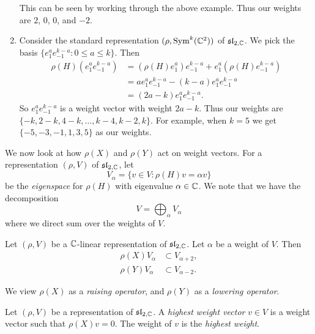 \begin{example}
\begin{enumerate}
\begin{lemma}
              \end{lemma}
              This can be seen by working through the above example. Thus our weights are $2$, $0$, $0$, and $-2$.
        \item Consider the standard representation $(\rho, \operatorname{Sym}^k(\mathbb C^2))$ of $\mathfrak{sl}_{2, \mathbb C}$. We pick the basis $\{e_1^ae_{-1}^{k-a}: 0 \leq a \leq k\}$. Then
              \begin{align*}
                  \rho(H)(e_1^ae_{-1}^{k-a})
                   & = \left(\rho(H)e_1^a\right)e_{-1}^{k-a} + e_1^a\left(\rho(H)e_{-1}^{k-a}\right) \\
                   & = ae_1^ae_{-1}^{k-a} - (k-a) e_1^ae_{-1}^{k-a}                                  \\
                   & = (2a-k) e_1^a e_{-1}^{k-a}.
              \end{align*}
              So $e_1^a e_{-1}^{k-a}$ is a weight vector with weight $2a - k$. Thus our weights are $\{-k, 2-k, 4-k, \ldots, k-4, k-2, k\}$.  For example, when $k = 5$ we get $\{-5, -3, -1, 1, 3, 5\}$ as our weights.
    \end{enumerate}
\end{example}

We now look at how $\rho(X)$ and $\rho(Y)$ act on weight vectors. For a representation $(\rho, V)$ of $\mathfrak{sl}_{2, \mathbb C}$, let
\[ V_\alpha = \{v \in V: \rho(H)v = \alpha v\} \]
be the \emph{eigenspace} for $\rho(H)$ with eigenvalue $\alpha \in \mathbb C$. We note that we have the decomposition
\[ V = \bigoplus_{\alpha} V_\alpha \]
where we direct sum over the weights of $V$.

\begin{proposition}
    Let $(\rho, V)$ be a $\mathbb C$-linear representation of $\mathfrak{sl}_{2, \mathbb C}$. Let $\alpha$ be a weight of $V$. Then
    \begin{align*}
        \rho(X)V_\alpha & \subset V_{\alpha + 2}, \\
        \rho(Y)V_\alpha & \subset V_{\alpha - 2}.
    \end{align*}
\end{proposition}

We view $\rho(X)$ as a \emph{raising operator}, and $\rho(Y)$ as a \emph{lowering operator}.

\begin{definition}
    Let $(\rho, V)$ be a representation of $\mathfrak{sl}_{2, \mathbb C}$. A \emph{highest weight vector} $v \in V$ is a weight vector such that $\rho(X)v = 0$. The weight of $v$ is the \emph{highest weight}.
\end{definition}

